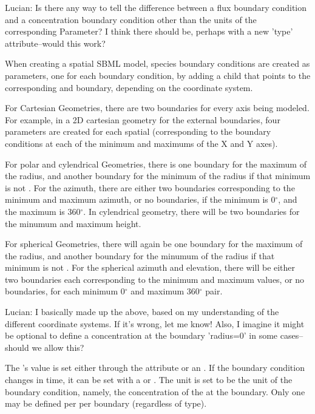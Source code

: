 {\color{red} Lucian: \notice Is there any way to tell the difference between a flux boundary condition and a concentration boundary condition other than the units of the corresponding Parameter?  I think there should be, perhaps with a new 'type' attribute--would this work?}

When creating a spatial SBML model, species boundary conditions are created as parameters, one for each boundary condition, by adding a child \BoundaryCondition that points to the corresponding \Species and boundary, depending on the coordinate system.

For Cartesian Geometries, there are two boundaries for every axis being modeled.  For example, in a 2D cartesian geometry for the external boundaries, four parameters are created for each spatial \Species (corresponding to the boundary conditions at each of the minimum and maximums of the X and Y axes).

For polar and cylendrical Geometries, there is one boundary for the maximum of the radius, and another boundary for the minimum of the radius if that minimum is not .  For the azimuth, there are either two boundaries corresponding to the minimum and maximum azimuth, or no boundaries, if the minimum is 0$^\circ$, and the maximum is 360$^\circ$.  In cylendrical geometry, there will be two boundaries for the minumum and maximum height.

For spherical Geometries, there will again be one boundary for the maximum of the radius, and another boundary for the minumum of the radius if that minimum is not .  For the spherical azimuth and elevation, there will be either two boundaries each corresponding to the minimum and maximum values, or no boundaries, for each minimum 0$^\circ$ and maximum 360$^\circ$ pair.

{\color{red} Lucian: \notice I basically made up the above, based on my understanding of the different coordinate systems.  If it's wrong, let me know!  Also, I imagine it might be optional to define a concentration at the boundary 'radius=0' in some cases--should we allow this?}

The \Parameter's value is set either through the  attribute or an \InitialAssignment.  If the boundary condition changes in time, it can be set with a \Rule or \Event.  The \Parameter unit is set to be the unit of the boundary condition, namely, the concentration of the \Species at the boundary.  Only one \BoundaryCondition may be defined per \Species per boundary (regardless of type).


